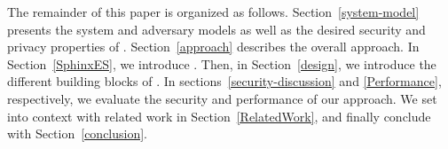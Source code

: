 The remainder of this paper is organized as follows. Section~\ref{system-model} presents the
system and adversary models as well as the desired security and
privacy properties of \name. Section~\ref{approach} describes the
overall approach. In Section~\ref{SphinxES}, we introduce \sphinxes. 
Then, in Section~\ref{design}, we introduce the different building
blocks of \name. In sections~\ref{security-discussion} and \ref{Performance},
respectively, we evaluate the security and performance of our
approach. We set \name into context with related work in
Section~\ref{RelatedWork}, and finally conclude with Section~\ref{conclusion}.

